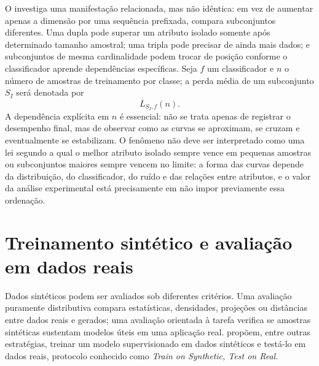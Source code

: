 O \CoInfoSim{} investiga uma manifestação relacionada, mas não idêntica: em vez de aumentar apenas a dimensão por uma sequência prefixada, compara subconjuntos diferentes. Uma dupla pode superar um atributo isolado somente após determinado tamanho amostral; uma tripla pode precisar de ainda mais dados; e subconjuntos de mesma cardinalidade podem trocar de posição conforme o classificador aprende dependências específicas. Seja $f$ um classificador e $n$ o número de amostras de treinamento por classe; a perda média de um subconjunto $S_I$ será denotada por
\begin{equation}
  \overline{L}_{S_I,f}(n).
  \label{eq:mean-loss-foundation}
\end{equation}
A dependência explícita em $n$ é essencial: não se trata apenas de registrar o desempenho final, mas de observar como as curvas se aproximam, se cruzam e eventualmente se estabilizam. O fenômeno não deve ser interpretado como uma lei segundo a qual o melhor atributo isolado sempre vence em pequenas amostras ou subconjuntos maiores sempre vencem no limite: a forma das curvas depende da distribuição, do classificador, do ruído e das relações entre atributos, e o valor da análise experimental está precisamente em não impor previamente essa ordenação.

\section{Treinamento sintético e avaliação em dados reais}

Dados sintéticos podem ser avaliados sob diferentes critérios. Uma avaliação puramente distributiva compara estatísticas, densidades, projeções ou distâncias entre dados reais e gerados; uma avaliação orientada à tarefa verifica se amostras sintéticas sustentam modelos úteis em uma aplicação real. \textcite{esteban2017} propõem, entre outras estratégias, treinar um modelo supervisionado em dados sintéticos e testá-lo em dados reais, protocolo conhecido como \emph{Train on Synthetic, Test on Real}.

